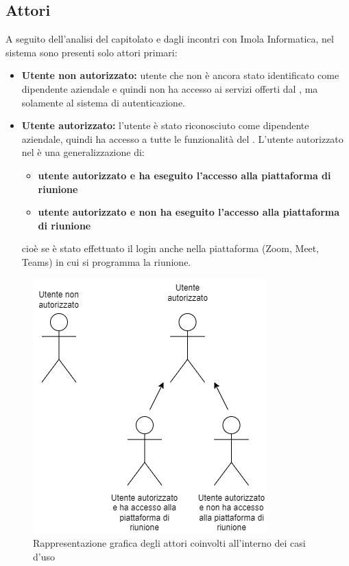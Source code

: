 \subsection{Attori}
A seguito dell'analisi del capitolato e dagli incontri con Imola Informatica, nel sistema sono 
presenti solo attori primari:
\begin{itemize}
    \item \textbf{Utente non autorizzato:} utente che non è ancora stato identificato come dipendente aziendale e quindi non ha accesso ai servizi offerti dal , ma solamente al sistema di autenticazione.
    \item \textbf{Utente autorizzato:} l'utente è stato riconosciuto come dipendente aziendale, quindi 
                ha accesso a tutte le funzionalità del . \newline
                L'utente autorizzato nel  è una generalizzazione di:
                \begin{itemize}
                \item \textbf{utente autorizzato e ha eseguito l'accesso alla piattaforma di riunione}
                \item \textbf{utente autorizzato e non ha eseguito l'accesso alla piattaforma di riunione}
                \end{itemize}
                cioè se è stato effettuato il login anche nella piattaforma (Zoom, Meet, Teams) in 
                cui si programma la riunione.
\end{itemize}

\begin{figure}[h]
    \centering
    \includegraphics[scale=1]{images/Attori.png} 
    \caption{Rappresentazione grafica degli attori coinvolti all'interno dei casi d'uso}
\end{figure}
\newpage